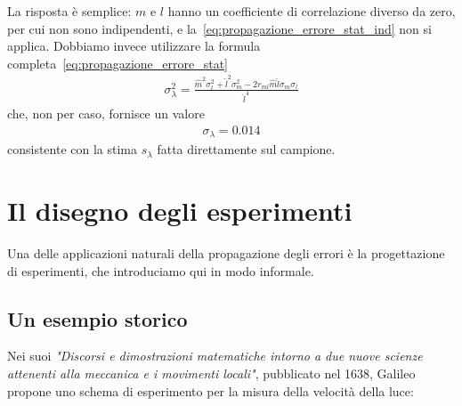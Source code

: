 La risposta è semplice: $m$ e $l$ hanno un coefficiente di correlazione
diverso da zero, per cui non sono indipendenti, e
la~\eqref{eq:propagazione_errore_stat_ind} non si applica. Dobbiamo invece
utilizzare la formula completa~\eqref{eq:propagazione_errore_stat}
\begin{align*}
  \sigma^2_\lambda =
  \frac{\hat{m}^2 \sigma_l^2 + \hat{l}^2 \sigma_m^2 -
    2r_{ml}\hat{m}\hat{l}\sigma_m \sigma_l}{\hat{l}^4}
\end{align*}
che, non per caso, fornisce un valore
\begin{align*}
  \sigma_\lambda = 0.014
\end{align*}
consistente con la stima $s_\lambda$ fatta direttamente sul campione.


\section{Il disegno degli esperimenti}

Una delle applicazioni naturali della propagazione degli errori è la
progettazione di esperimenti, che introduciamo qui in modo informale.


\subsection{Un esempio storico}

Nei suoi \emph{"Discorsi e dimostrazioni matematiche intorno a due nuove scienze
attenenti alla meccanica e i movimenti locali"}, pubblicato nel 1638, Galileo
propone uno schema di esperimento per la misura della velocità della luce:

